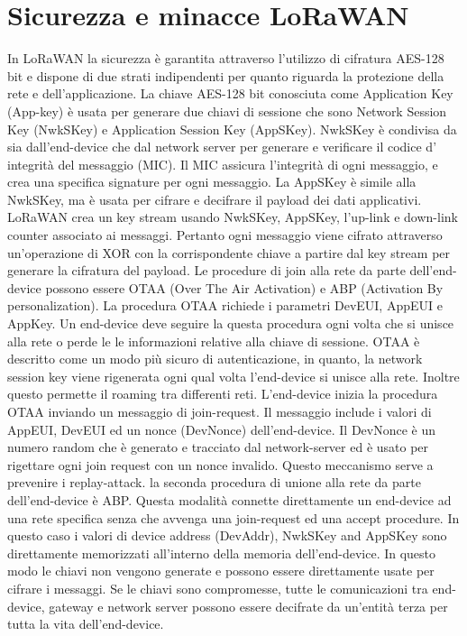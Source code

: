 \documentclass[12pt,a4paper,openright,twoside]{report}
\begin{document}
\section{Sicurezza e minacce LoRaWAN}
In LoRaWAN la sicurezza \`e garantita attraverso l'utilizzo di cifratura AES-128 bit e dispone di due strati indipendenti per quanto riguarda la protezione della rete e dell'applicazione.
La chiave AES-128 bit conosciuta come Application Key (App-key) \`e usata per generare due chiavi di sessione che sono Network Session Key (NwkSKey) e Application Session Key (AppSKey). 
NwkSKey \`e condivisa da sia dall'end-device che dal network server per generare e verificare il codice d' integrit\`a del messaggio (MIC). Il MIC assicura l'integrit\`a di ogni messaggio, e crea una specifica signature per ogni messaggio. 
La AppSKey \`e simile alla NwkSKey, ma \`e usata per cifrare e decifrare il payload dei dati applicativi.
LoRaWAN crea un key stream usando NwkSKey, AppSKey, l'up-link e down-link counter associato ai messaggi. Pertanto ogni messaggio viene cifrato attraverso un'operazione di XOR con la corrispondente chiave a partire dal key stream per generare la cifratura del payload. 
Le procedure di join alla rete da parte dell'end-device possono essere OTAA (Over The Air Activation) e ABP (Activation By personalization). La procedura OTAA richiede i parametri DevEUI, AppEUI e AppKey. Un end-device deve seguire la questa procedura ogni volta che si unisce alla rete o perde le le informazioni relative alla chiave di sessione. OTAA \`e descritto come un modo pi\`u sicuro di autenticazione, in quanto, la network session key viene rigenerata ogni qual volta l'end-device si unisce alla rete. Inoltre questo permette il roaming tra differenti reti. L'end-device inizia la procedura OTAA inviando un messaggio di join-request. Il messaggio include i valori di AppEUI, DevEUI ed un nonce (DevNonce) dell'end-device. Il DevNonce \`e un numero random che \`e generato e tracciato dal network-server ed \`e usato per rigettare ogni join request con un nonce invalido. Questo meccanismo serve a prevenire i replay-attack. 
la seconda procedura di unione alla rete da parte dell'end-device \`e ABP. Questa modalit\`a connette direttamente un end-device ad una rete specifica senza che avvenga una join-request ed una accept procedure. In questo caso i valori di device address (DevAddr), NwkSKey and AppSKey sono direttamente memorizzati all'interno della memoria dell'end-device. In questo modo le chiavi non vengono generate e possono essere direttamente usate per cifrare i messaggi. Se le chiavi sono compromesse, tutte le comunicazioni tra end-device, gateway e network server possono essere decifrate da un'entit\`a terza per tutta la vita dell'end-device.
\end{document}
